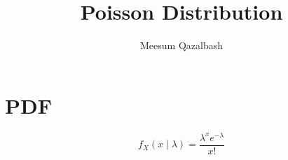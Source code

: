 \documentclass{article}
\title{Poisson Distribution}
\author{Meesum Qazalbash}
\begin{document}
\maketitle

\section{PDF}

\begin{equation}
    f_{X}(x\mid\lambda) = \frac{\lambda^{x}e^{-\lambda}}{x!}
\end{equation}
\end{document}
